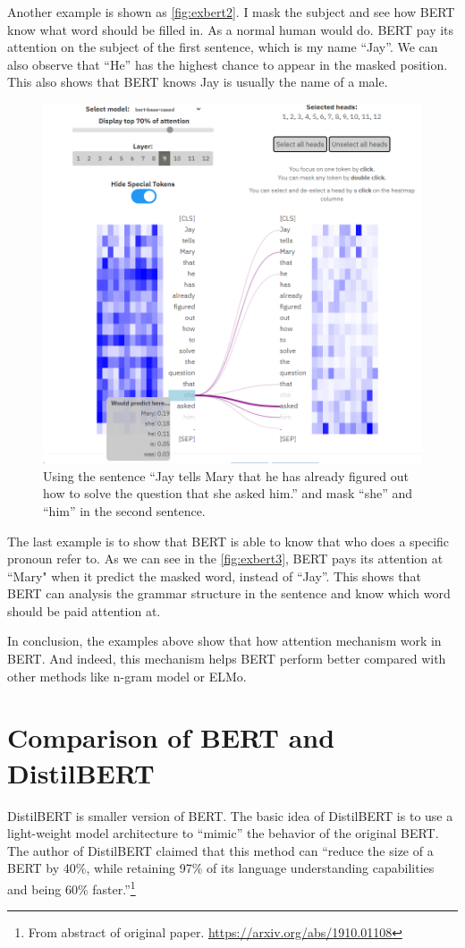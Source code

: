 \documentclass{article}[12pt]
\begin{document}
Another example is shown as \autoref{fig:exbert2}. I mask the subject and see how BERT know what word should be filled in. As a normal human would do. BERT pay its attention on the subject of the first sentence, which is my name ``Jay''. We can also observe that ``He'' has the highest chance to appear in the masked position. This also shows that BERT knows Jay is usually the name of a male.

\begin{figure}[htbp]
	\centering
	\includegraphics[width=0.7\linewidth]{figure/exbert3}
	\caption{Using the sentence ``Jay tells Mary that he has already figured out how to solve the question that she asked him.'' and mask ``she'' and ``him'' in the second sentence.}
	\label{fig:exbert3}
\end{figure}

The last example is to show that BERT is able to know that who does a specific pronoun refer to. As we can see in the \autoref{fig:exbert3}, BERT pays its attention at ``Mary" when it predict the masked word, instead of ``Jay''. This shows that BERT can analysis the grammar structure in the sentence and know which word should be paid attention at.

In conclusion, the examples above show that how attention mechanism work in BERT. And indeed, this mechanism helps BERT perform better compared with other methods like n-gram model or ELMo.

\section{Comparison of BERT and DistilBERT}

DistilBERT is smaller version of BERT. The basic idea of DistilBERT is to use a light-weight model architecture to ``mimic'' the behavior of the original BERT. The author of DistilBERT claimed that this method can ``reduce the size of a BERT by 40\%, while retaining 97\% of its language understanding capabilities and being 60\% faster.''\footnote{From abstract of original paper. \url{https://arxiv.org/abs/1910.01108}}
\end{document}
